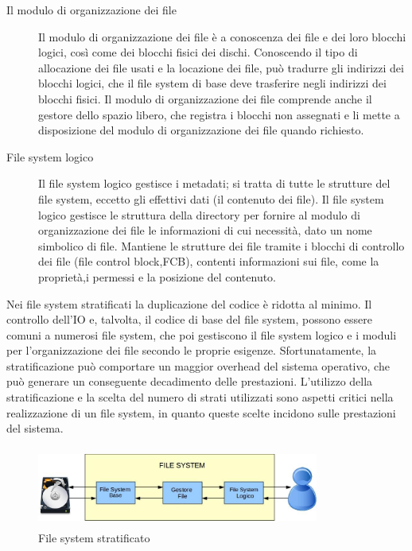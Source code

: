 		\begin{description}
		\item[Il modulo di organizzazione dei file]
		Il  modulo di organizzazione dei file è a conoscenza
		dei file e dei loro blocchi logici, così come dei blocchi
		fisici dei dischi. Conoscendo il tipo di allocazione dei file
		usati e la locazione dei file, può tradurre gli indirizzi
		dei blocchi logici, che il file system di base deve trasferire
		negli indirizzi dei blocchi fisici.
		Il modulo di organizzazione dei file comprende anche il
		gestore dello spazio libero, che registra i blocchi non
		assegnati e li mette a disposizione del modulo di
		organizzazione dei file quando richiesto. 	
		\end{description}

		\begin{description}
		\item[File system logico]
		Il file system logico gestisce i metadati; si tratta
		di tutte le strutture del file system, eccetto gli effettivi
		dati (il contenuto dei file). Il file system logico gestisce
		le struttura  della directory per fornire al modulo di
		organizzazione dei file le informazioni di cui necessità,
		dato un nome simbolico di file. Mantiene le strutture dei
		file tramite i blocchi di controllo dei file (file control
		block,FCB), contenti informazioni sui file, come la
		proprietà,i permessi e la posizione del contenuto. 
                \end{description}
	 Nei file system stratificati la  duplicazione del codice è ridotta al minimo. Il controllo dell'IO e, talvolta, il codice di base del file system, possono 
	  essere comuni a numerosi file system, che poi gestiscono il file system logico e i moduli per l'organizzazione dei file secondo le proprie esigenze. 
          Sfortunatamente, la stratificazione può comportare un maggior overhead del sistema operativo, che può generare un conseguente decadimento delle prestazioni. 
         L'utilizzo della stratificazione e la scelta del numero di strati utilizzati sono aspetti critici nella realizzazione di un file system, in quanto queste scelte 
        incidono sulle prestazioni del sistema.         
	\begin{figure}[h]
 \centering
 \includegraphics[width=350px,height=100px]{./Immagini/schema.jpg}
 \caption{File system stratificato}
 \label{fig:Schema}
\end{figure}

